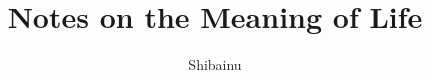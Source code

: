 \documentclass{article}
\author{Shibainu}
\title{Notes on the Meaning of Life}
\begin{document}
\date{}
\maketitle
\end{document}
